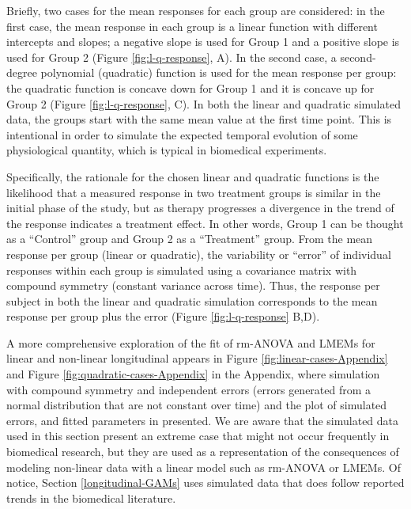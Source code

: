 \documentclass[
]{article}
\begin{document}
Briefly, two cases for the mean responses for each group are considered: in the first case, the mean response in each group is a linear function with different intercepts and slopes; a negative slope is used for Group 1 and a positive slope is used for Group 2 (Figure \ref{fig:l-q-response}, A). In the second case, a second-degree polynomial (quadratic) function is used for the mean response per group: the quadratic function is concave down for Group 1 and it is concave up for Group 2 (Figure \ref{fig:l-q-response}, C). In both the linear and quadratic simulated data, the groups start with the same mean value at the first time point. This is intentional in order to simulate the expected temporal evolution of some physiological quantity, which is typical in biomedical experiments.

Specifically, the rationale for the chosen linear and quadratic functions is the likelihood that a measured response in two treatment groups is similar in the initial phase of the study, but as therapy progresses a divergence in the trend of the response indicates a treatment effect. In other words, Group 1 can be thought as a ``Control'' group and Group 2 as a ``Treatment'' group. From the mean response per group (linear or quadratic), the variability or ``error'' of individual responses within each group is simulated using a covariance matrix with compound symmetry (constant variance across time). Thus, the response per subject in both the linear and quadratic simulation corresponds to the mean response per group plus the error (Figure \ref{fig:l-q-response} B,D).

A more comprehensive exploration of the fit of rm-ANOVA and LMEMs for linear and non-linear longitudinal appears in Figure \ref{fig:linear-cases-Appendix} and Figure \ref{fig:quadratic-cases-Appendix} in the Appendix, where simulation with compound symmetry and independent errors (errors generated from a normal distribution that are not constant over time) and the plot of simulated errors, and fitted parameters in presented. We are aware that the simulated data used in this section present an extreme case that might not occur frequently in biomedical research, but they are used as a representation of the consequences of modeling non-linear data with a linear model such as rm-ANOVA or LMEMs. Of notice, Section \ref{longitudinal-GAMs} uses simulated data that does follow reported trends in the biomedical literature.
\end{document}
